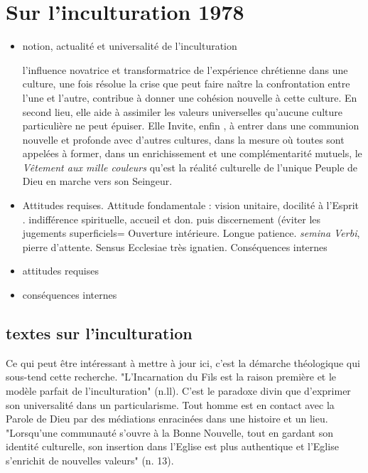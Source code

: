 \section{Sur l'inculturation 1978}
\begin{itemize}
    \item notion, actualité et universalité de l'inculturation
    \begin{singlequote}
        l'influence novatrice et transformatrice de l'expérience chrétienne dans une culture, une fois résolue la crise que peut faire naître la confrontation entre l'une et l'autre, contribue à donner une cohésion nouvelle à cette culture. En second lieu, elle aide à assimiler les valeurs universelles qu'aucune culture particulière ne peut épuiser. Elle Invite, enfin , à entrer dans une communion nouvelle et profonde avec d'autres cultures, dans la mesure où toutes sont appelées à former, dans un enrichissement et une complémentarité mutuels, le \textit{Vêtement aux mille couleurs} qu'est la réalité culturelle de l'unique Peuple de Dieu en marche vers son Seingeur.
    \end{singlequote}
    \item Attitudes requises. Attitude fondamentale : vision unitaire, docilité à l'Esprit
    . indifférence spirituelle, accueil et don. puis discernement (éviter les jugements superficiels= Ouverture intérieure. Longue patience.  \textit{semina Verbi}, pierre d'attente. Sensus Ecclesiae très ignatien. 
        Conséquences internes
       \item attitudes requises
       \item conséquences internes
       
    
    
    
\end{itemize}
 \subsection{textes sur l'inculturation}
Ce qui peut être intéressant à mettre à jour ici, c’est la démarche théologique qui
sous-tend cette recherche. "L'Incarnation du Fils est la raison première et le modèle
parfait de l'inculturation" (n.ll). C'est le paradoxe divin que d'exprimer son universalité
dans un particularisme. Tout homme est en contact avec la Parole de Dieu par des
médiations enracinées dans une histoire et un lieu. "Lorsqu'une communauté s'ouvre à la
Bonne Nouvelle, tout en gardant son identité culturelle, son insertion dans l'Eglise est
plus authentique et l'Eglise s'enrichit de nouvelles valeurs" (n. 13).

